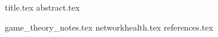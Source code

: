 \documentclass[11pt]{llncs}
\begin{document}
  {title.tex}
  \thispagestyle{plain}
  {abstract.tex}

  {game_theory_notes.tex}
  {networkhealth.tex}
  {references.tex}
\end{document}
